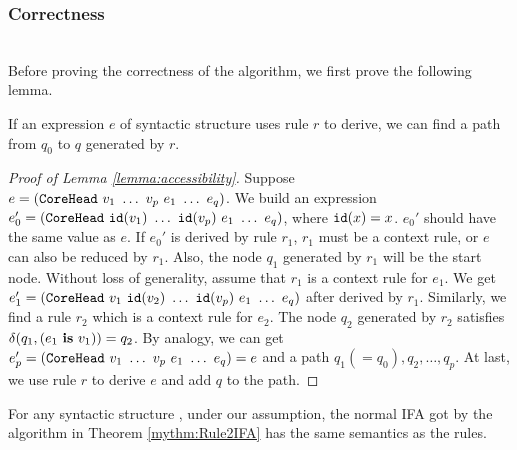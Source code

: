 \subsubsection{Correctness}
~\\

Before proving the correctness of the algorithm, we first prove the following lemma.

\begin{lemma}
    \label{lemma:accessibility}
    If an expression $e$ of syntactic structure  uses rule $r$ to derive, we can find a path from $q_0$ to $q$ generated by $r$.
\end{lemma}

\begin{proof}[Proof of Lemma \ref{lemma:accessibility}]
    Suppose $e=(\mbox{\tt CoreHead}~v_1~\ldots~v_p~e_1~\ldots~e_q)$. We build an expression $e_0'=(\mbox{\tt CoreHead}~\mbox{\tt id}(v_1)~\ldots~\mbox{\tt id}(v_p)~e_1~\ldots~e_q)$, where $\mbox{\tt id}(x)=x$. $e_0'$ should have the same value as $e$. If $e_0'$ is derived by rule $r_1$, $r_1$ must be a context rule, or $e$ can also be reduced by $r_1$. Also, the node $q_1$ generated by $r_1$ will be the start node. Without loss of generality, assume that $r_1$ is a context rule for $e_1$. We get $e_1'=(\mbox{\tt CoreHead}~v_1~\mbox{\tt id}(v_2)~\ldots~\mbox{\tt id}(v_p)~e_1~\ldots~e_q)$ after derived by $r_1$. Similarly, we find a rule $r_2$ which is a context rule for $e_2$. The node $q_2$ generated by $r_2$ satisfies $\delta(q_1, (e_1~\mbox{\rm \bf is}~v_1))=q_2$. By analogy, we can get $e_p'=(\mbox{\tt CoreHead}~v_1~\ldots~v_p~e_1~\ldots~e_q)=e$ and a path $q_1(=q_0), q_2, \ldots, q_p$. At last, we use rule $r$ to derive $e$ and add $q$ to the path.
\end{proof}

\begin{lemma}[Correctness]
    \label{lemma:rule2ifa-correct}
    For any syntactic structure , under our assumption, the normal IFA got by the algorithm in Theorem \ref{mythm:Rule2IFA} has the same semantics as the rules.
\end{lemma}


